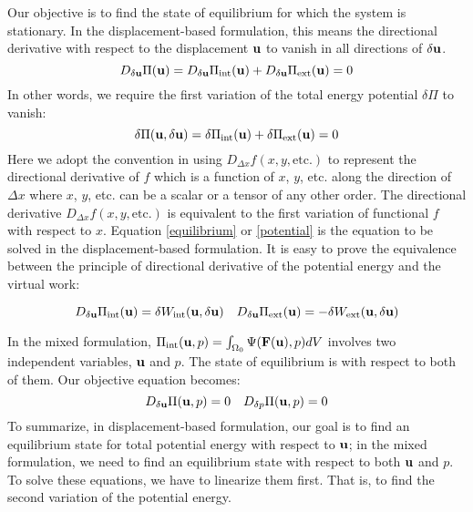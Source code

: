 Our objective is to find the state of equilibrium for which the system is stationary. In the displacement-based formulation, this means the directional derivative with respect to the displacement $\bold{u}$ to vanish in all directions of $\delta{\bold{u}}$.
\begin{equation} \label{equilibrium}
D_{\delta\bold{u}}\Pi(\bold{u}) = D_{\delta\bold{u}}\Pi_\mathrm{int}(\bold{u}) + D_{\delta\bold{u}}\Pi_\mathrm{ext}(\bold{u}) = 0
\end{equation} 
In other words, we require the first variation of the total energy potential $\delta\Pi$ to vanish:
\begin{equation} \label{potential}
\delta\Pi(\bold{u}, \delta\bold{u}) =\delta\Pi_\mathrm{int}(\bold{u}) + \delta\Pi_\mathrm{ext}(\bold{u}) = 0
\end{equation}
Here we adopt the convention in \cite{Holzapfel} using $D_{\Delta{x}}f(x, y, \mathrm{etc.})$ to represent the directional derivative of $f$ which is a function of $x$, $y$, etc. along the direction of $\Delta{x}$ where $x$, $y$, etc. can be a scalar or a tensor of any other order. The directional derivative $D_{\Delta{x}}f(x, y, \mathrm{etc.})$ is equivalent to the first variation of functional $f$ with respect to $x$.
Equation \ref{equilibrium} or \ref{potential} is the equation to be solved in the displacement-based formulation. It is easy to prove the equivalence between the principle of directional derivative of the potential energy and the virtual work:

\begin{equation}
D_{\delta\bold{u}}\Pi_\mathrm{int}(\bold{u}) = \delta W_\mathrm{int}(\bold{u}, \delta\bold{u}) \quad
D_{\delta\bold{u}}\Pi_\mathrm{ext}(\bold{u}) = - \delta W_\mathrm{ext}(\bold{u}, \delta\bold{u})
\end{equation}

In the mixed formulation, $\Pi_\mathrm{int}(\bold{u}, p) = \int_{\Omega_{0}}\Psi(\bold{F}(\bold{u}), p)dV$ involves two independent variables, $\bold{u}$ and $p$. The state of equilibrium is with respect to both of them. Our objective equation becomes:
\begin{equation} \label{target}
D_{\delta\bold{u}}\Pi(\bold{u}, p) = 0 \quad D_{\delta{p}}\Pi(\bold{u}, p) = 0
\end{equation}
To summarize, in displacement-based formulation, our goal is to find an equilibrium state for total potential energy with respect to $\bold{u}$; in the mixed formulation, we need to find an equilibrium state with respect to both $\bold{u}$ and $p$. To solve these equations, we have to linearize them first. That is, to find the second variation of the potential energy.



